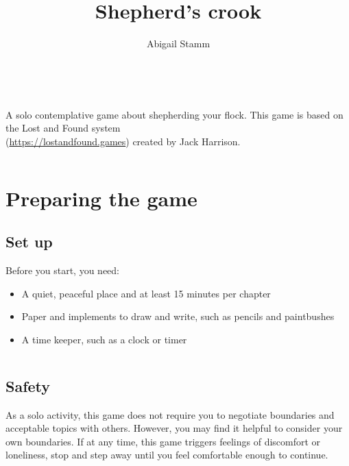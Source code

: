 \documentclass[
  a5paper,
]{article}
\title{Shepherd's crook}
\author{Abigail Stamm}
\date{}
\providecommand{\tightlist}{%
  \setlength{\itemsep}{0pt}\setlength{\parskip}{0pt}}
\begin{document}
\maketitle

{
\setcounter{tocdepth}{1}
\tableofcontents
}
\pagebreak

\(~\)

\(~\)

A solo contemplative game about shepherding your flock.
This game is based on the Lost and Found system\\
(\url{https://lostandfound.games}) created by Jack Harrison.

\pagebreak

\(~\)

\hypertarget{preparing-the-game}{%
\section{Preparing the game}\label{preparing-the-game}}

\hypertarget{set-up}{%
\subsection{Set up}\label{set-up}}

Before you start, you need:

\begin{itemize}
\tightlist
\item
  A quiet, peaceful place and at least 15 minutes per chapter
\item
  Paper and implements to draw and write, such as pencils and paintbushes
\item
  A time keeper, such as a clock or timer
\end{itemize}

\(~\)

\hypertarget{safety}{%
\subsection{Safety}\label{safety}}

As a solo activity, this game does not require you to negotiate boundaries and acceptable topics with others. However, you may find it helpful to consider your own boundaries. If at any time, this game triggers feelings of discomfort or loneliness, stop and step away until you feel comfortable enough to continue.

\pagebreak

\(~\)
\end{document}
